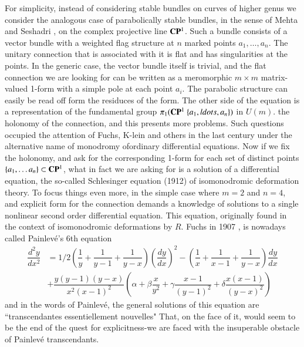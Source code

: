 For simplicity, instead of considering stable bundles on curves of higher genus we consider the analogous case of parabolically stable bundles, in the sense of Mehta and Seshadri \cite{art7-key11}, on the complex projective line $\mathbf{C}\mathbf{P}^{1}$. Such a bundle consists of a vector bundle with a weighted flag structure at $n$ marked points $a_{1}, \ldots, a_{n}$. The unitary connection that is associated with it is flat and has singularities at the points. In the generic case, the vector bundle itself is trivial, and the flat connection we are looking for can be written as a meromorphic $m \times m$ matrix-valued 1-form with a simple pole at each point $a_{i}$. The parabolic structure can easily be read off form the residuces of the form. The other side of the equation is a representation of the fundamental group $\pi_{1}(\bC\bP^{1}\ \{a_{1}, ldots, a_{n}\})$ in $U(m)$. the holonomy of the connection, and this presents more problems. Such questions occupied the attention of Fuchs, K-lein and others in the last century under the alternative name of monodromy of\pageoriginale ordinary differential equations. Now if we fix the holonomy, and ask for the corresponding 1-form for each set of distinct points $\{a_{1}, \ldots a_{n}\}\subset \mathbf{C}\mathbf{P}^{1}$, what in fact we are asking for is a solution of a differential equation, the so-called Schlesinger equation (1912) of isomonodromic deformation theory. To focus things even more, in the simple case where $m=2$ and $n =4$, and explicit form for the connection demands a knowledge of solutions to a single nonlinear second order differential equation. This equation, originally found in the context of isomonodromic deformations by $R$. Fuchs in 1907 \cite{art7-key4}, is nowadays called Painlev\'e's 6th equation
{\small
\begin{equation*}
\begin{split}
\dfrac{d^{2}y}{dx^{2}} & = 1/2 \left(\dfrac{1}{y} + \dfrac{1}{y-1} + \dfrac{1}{y-x}\right)\left(\dfrac{dy}{dx}\right)^{2} - \left(\dfrac{1}{x} + \dfrac{1}{x-1} + \dfrac{1}{y-x}\right) \dfrac{dy}{dx} \\
 &+ \dfrac{y(y-1)(y-x)}{x^{2}(x-1)^{2}} \left(\alpha + \beta\dfrac{x}{y^{2}} + \gamma\dfrac{x-1}{(y-1)^{2}} + \delta\dfrac{x(x-1)}{(y-x)^{2}}\right)
\end{split}
\end{equation*}
}\relax
and in the words of Painlev\'e, the general solutions of this equation are ``transcendantes essentiellement nouvelles"  That, on the face of it, would seem to be the end of the quest for explicitness-we are faced with the insuperable obstacle of Painlev\'e transcendants.


